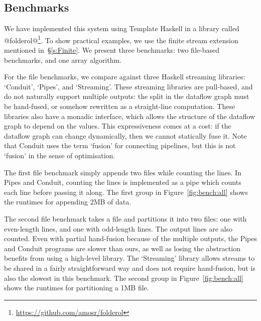

\subsection{Benchmarks}
We have implemented this system using Template Haskell in a library called @folderol@\footnote{\url{https://github.com/amosr/folderol}}.
To show practical examples, we use the finite stream extension mentioned in~\S\ref{s:Finite}.
We present three benchmarks: two file-based benchmarks, and one array algorithm.

For the file benchmarks, we compare against three Haskell streaming libraries: `Conduit', `Pipes', and `Streaming'.
These streaming libraries are pull-based, and do not naturally support multiple outputs: the split in the dataflow graph must be hand-fused, or somehow rewritten as a straight-line computation.
These libraries also have a monadic interface, which allows the structure of the dataflow graph to depend on the values. This expressiveness comes at a cost: if the dataflow graph can change dynamically, then we cannot statically fuse it.
Note that Conduit uses the term `fusion' for connecting pipelines, but this is not `fusion' in the sense of optimisation.

The first file benchmark simply appends two files while counting the lines.
In Pipes and Conduit, counting the lines is implemented as a pipe which counts each line before passing it along.
The first group in Figure~\ref{fig:bench:all} shows the runtimes for appending 2MB of data.

The second file benchmark takes a file and partitions it into two files: one with even-length lines, and one with odd-length lines.
The output lines are also counted.
Even with partial hand-fusion because of the multiple outputs, the Pipes and Conduit programs are slower than ours, as well as losing the abstraction benefits from using a high-level library.
The `Streaming' library allows streams to be shared in a fairly straightforward way and does not require hand-fusion, but is also the slowest in this benchmark.
The second group in Figure~\ref{fig:bench:all} shows the runtimes for partitioning a 1MB file.


